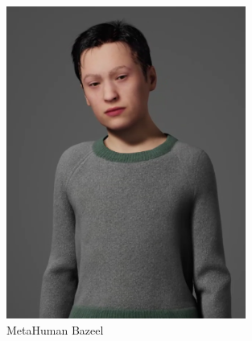 \documentclass[../../main.tex]{subfiles}
\begin{document}
\begin{figure}[h]
    \centering
    \includegraphics[width=0.7\textwidth]{chapters/conclusion/images/metahuman_bazeel.png}
    \caption{MetaHuman Bazeel}
    \label{fig:conclusion:metahuman_bazeel}
\end{figure}
\end{document}
